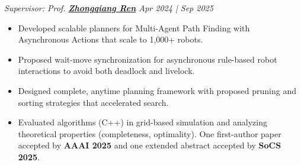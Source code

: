 \documentclass[a4paper,9pt]{extarticle}
\begin{document}
\par\textit{Supervisor: Prof. {\href{https://rap-lab.github.io/team/zren/}{\textbf{Zhongqiang Ren}}} \hfill   Apr 2024 | Sep 2025} %
\begin{itemize}
    \item Developed scalable planners for Multi-Agent Path Finding with Asynchronous Actions that scale to 1,000+ robots.
    \item Proposed wait-move synchronization for asynchronous rule-based robot interactions to avoid both deadlock and livelock.
    \item Designed complete, anytime planning framework with proposed pruning and sorting strategies that accelerated search. 
    \item Evaluated algorithms (C++) in grid-based simulation and analyzing theoretical properties (completeness, optimality). One first-author paper accepted by \textbf{AAAI 2025} and one extended abstract accepted by \textbf{SoCS 2025}.
\end{itemize}
\end{document}
